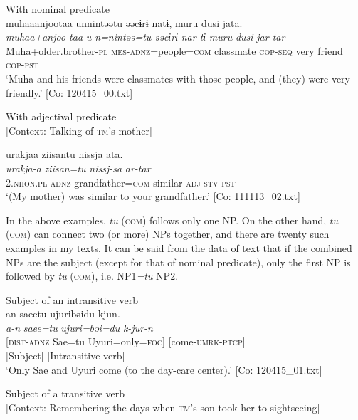 \ex With nominal predicate\\
{\TM}
\glll  muhaaanjootaa  unnintəətu  əəcɨrɨ  natɨ,     muru  dusi  jata.\\
\textit{muhaa+anjoo-taa}  \textit{u-n=nintəə=tu}  \textit{əəcɨrɨ}  \textit{nar-tɨ}   \textit{muru}  \textit{dusi}  \textit{jar-tar}\\
Muha+older.brother-\textsc{pl}  \textsc{mes}-\textsc{adnz}=people=\textsc{com}  classmate  \textsc{cop}-\textsc{seq}   very  friend  \textsc{cop}-\textsc{pst}\\
\glt ‘Muha and his friends were classmates with those people, and (they) were very friendly.’ [Co: 120415\_00.txt]

\ex With adjectival predicate\\{}
[Context: Talking of \textsc{tm}’s mother]

{\TM}
\glll urakjaa  ziisantu  nissja  ata.\\
      \textit{urakja-a}  \textit{ziisan=tu}  \textit{nissj-sa}  \textit{ar-tar}\\
      2.\textsc{nhon}.\textsc{pl}-\textsc{adnz}  grandfather=\textsc{com}  similar-\textsc{adj}  \textsc{stv}-\textsc{pst}\\
\glt ‘(My mother) was similar to your grandfather.’ [Co: 111113\_02.txt]
\z
\z

In the above examples, \textit{tu} (\textsc{com}) follows only one NP. On the other hand, \textit{tu} (\textsc{com}) can connect two (or more) NPs together, and there are twenty such examples in my texts. It can be said from the data of text that if the combined NPs are the subject (except for that of nominal predicate), only the first NP is followed by \textit{tu} (\textsc{com}), i.e. NP1\textit{=tu} NP2.

\ea\label{ex:6-74}
\ea Subject of an intransitive verb\\
{\TM}
\gllll  an  saeetu  ujuribəidu  kjun.\\
\textit{a-n}  \textit{saee=tu}  \textit{ujuri=bəi=du}  \textit{k-jur-n}\\
{}[\textsc{dist}-\textsc{adnz}  Sae=tu  Uyuri=only=\textsc{foc}]  [come-\textsc{umrk}-\textsc{ptcp}]\\
      {}[Subject]  [Intransitive verb]\\
\glt ‘Only Sae and Uyuri come (to the day-care center).’ [Co: 120415\_01.txt]

\ex Subject of a transitive verb\\{}
[Context: Remembering the days when \textsc{tm}’s son took her to sightseeing]

